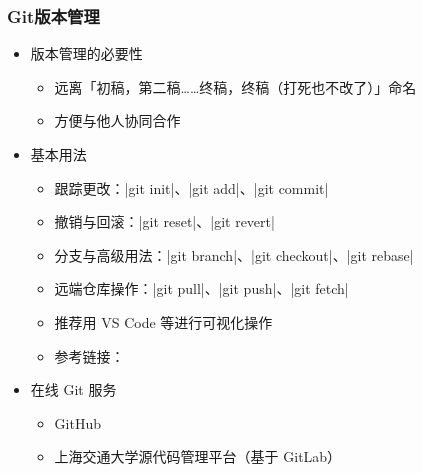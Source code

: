 \begin{frame}[fragile]
  \frametitle{Git版本管理}
  \begin{itemize}
    \item 版本管理的必要性
          \begin{itemize}
            \item 远离「初稿，第二稿……终稿，终稿（打死也不改了）」命名
            \item 方便与他人协同合作
          \end{itemize}
    \item 基本用法
          \begin{itemize}
            \item 跟踪更改：|git init|、|git add|、|git commit|
            \item 撤销与回滚：|git reset|、|git revert|
            \item 分支与高级用法：|git branch|、|git checkout|、|git rebase|
            \item 远端仓库操作：|git pull|、|git push|、|git fetch|
            \item 推荐用 VS Code 等进行可视化操作
            \item 参考链接：
          \end{itemize}
    \item 在线 Git 服务
          \begin{itemize}
            \item GitHub \href{https://github.com}{\faGithub}
            \item 上海交通大学源代码管理平台（基于 GitLab） 
          \end{itemize}
  \end{itemize}
\end{frame}


